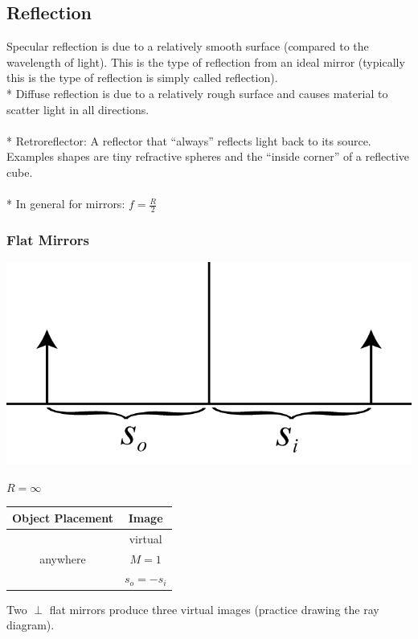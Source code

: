 \subsection{Reflection}
Specular reflection is due to a relatively smooth surface (compared to the wavelength of light).
This is the type of reflection from an ideal mirror (typically this is the type of reflection is simply called reflection).\\*
Diffuse reflection is due to a relatively rough surface and causes material to scatter light in all directions.\\\\*
Retroreflector: A reflector that ``always'' reflects light back to its source. Examples shapes are tiny refractive spheres and the ``inside corner'' of a reflective cube.\\\\*
In general for mirrors: \(\displaystyle f=\frac{R}{2}\)

\subsubsection{Flat Mirrors}
\begin{center}
\includegraphics[scale=0.6]{images/PGRE_Figures_3p2p1_Flat_Mirror.png}
\end{center}
\(R=\infty\)
\begin{center}
  \begin{tabular}{ c | c  }
    Object Placement & Image \\ \hline%
    \multirow{3}{*}{ anywhere} & virtual \\
    & \(M=1\) \\
    & \(s_o=-s_i\) \\
    \hline
  \end{tabular}
\end{center}
Two \(\perp\) flat mirrors produce three virtual images (practice drawing the ray diagram).

